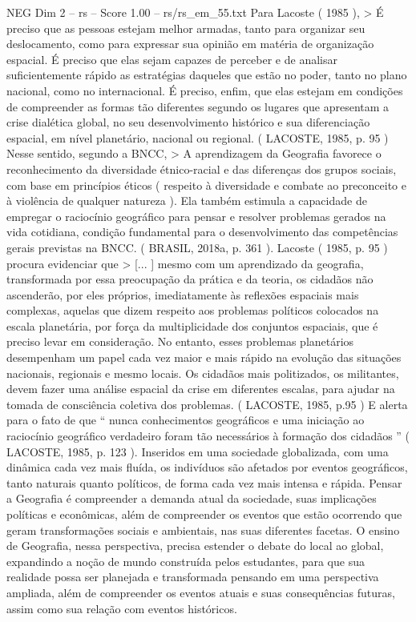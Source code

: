 \begin{textsample}{NEG Dim 2 – rs – Score 1.00 – rs/rs\_em\_55.txt}
Para Lacoste ( 1985 ), > É preciso que as pessoas estejam melhor armadas, tanto para organizar seu deslocamento, como para expressar sua opinião em matéria de organização espacial.
É preciso que elas sejam capazes de perceber e de analisar suficientemente rápido as estratégias daqueles que estão no poder, tanto no plano nacional, como no internacional.
É preciso, enfim, que elas estejam em condições de compreender as formas tão diferentes segundo os lugares que apresentam a crise dialética global, no seu desenvolvimento histórico e sua diferenciação espacial, em nível planetário, nacional ou regional. ( LACOSTE, 1985, p. 95 ) Nesse sentido, segundo a BNCC, > A aprendizagem da Geografia favorece o reconhecimento da diversidade étnico-racial e das diferenças dos grupos sociais, com base em princípios éticos ( respeito à diversidade e combate ao preconceito e à violência de qualquer natureza ).
Ela também estimula a capacidade de empregar o raciocínio geográfico para pensar e resolver problemas gerados na vida cotidiana, condição fundamental para o desenvolvimento das competências gerais previstas na BNCC. ( BRASIL, 2018a, p. 361 ).
Lacoste ( 1985, p. 95 ) procura evidenciar que > [... ] mesmo com um aprendizado da geografia, transformada por essa preocupação da prática e da teoria, os cidadãos não ascenderão, por eles próprios, imediatamente às reflexões espaciais mais complexas, aquelas que dizem respeito aos problemas políticos colocados na escala planetária, por força da multiplicidade dos conjuntos espaciais, que é preciso levar em consideração.
No entanto, esses problemas planetários desempenham um papel cada vez maior e mais rápido na evolução das situações nacionais, regionais e mesmo locais.
Os cidadãos mais politizados, os militantes, devem fazer uma análise espacial da crise em diferentes escalas, para ajudar na tomada de consciência coletiva dos problemas. ( LACOSTE, 1985, p.95 ) E alerta para o fato de que “ nunca conhecimentos geográficos e uma iniciação ao raciocínio geográfico verdadeiro foram tão necessários à formação dos cidadãos ” ( LACOSTE, 1985, p. 123 ).
Inseridos em uma sociedade globalizada, com uma dinâmica cada vez mais fluída, os indivíduos são afetados por eventos geográficos, tanto naturais quanto políticos, de forma cada vez mais intensa e rápida.
Pensar a Geografia é compreender a demanda atual da sociedade, suas implicações políticas e econômicas, além de compreender os eventos que estão ocorrendo que geram transformações sociais e ambientais, nas suas diferentes facetas.
O ensino de Geografia, nessa perspectiva, precisa estender o debate do local ao global, expandindo a noção de mundo construída pelos estudantes, para que sua realidade possa ser planejada e transformada pensando em uma perspectiva ampliada, além de compreender os eventos atuais e suas consequências futuras, assim como sua relação com eventos históricos.

\end{textsample}

